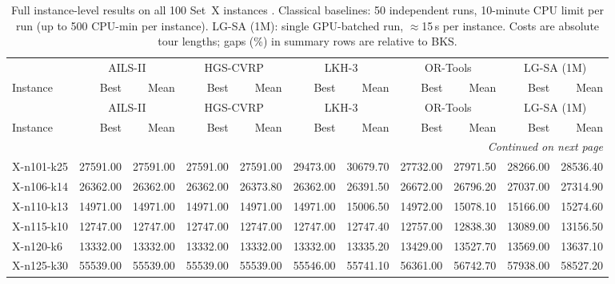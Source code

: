 \documentclass[letterpaper]{article} %
\begin{document}
\clearpage
\onecolumn
\begin{landscape}
\centering
\scriptsize
\setlength{\tabcolsep}{3pt}
\begin{longtable}{@{}l rr rr rr rr rr@{}}
\caption{Full instance-level results on all 100 Set~X instances \citep{uchoa_new_2017}. Classical baselines: 50 independent runs, 10-minute CPU limit per run (up to 500 CPU-min per instance). LG-SA (1M): single GPU-batched run, $\approx$15\,s per instance. Costs are absolute tour lengths; gaps (\%) in summary rows are relative to BKS.}
\label{tab:setx_full} \\
\toprule
& \multicolumn{2}{c}{AILS-II} & \multicolumn{2}{c}{HGS-CVRP} & \multicolumn{2}{c}{LKH-3} & \multicolumn{2}{c}{OR-Tools} & \multicolumn{2}{c}{LG-SA (1M)} \\
\cmidrule(lr){2-3}\cmidrule(lr){4-5}\cmidrule(lr){6-7}\cmidrule(lr){8-9}\cmidrule(lr){10-11}
Instance & Best & Mean & Best & Mean & Best & Mean & Best & Mean & Best & Mean \\
\midrule
\endfirsthead
\toprule
& \multicolumn{2}{c}{AILS-II} & \multicolumn{2}{c}{HGS-CVRP} & \multicolumn{2}{c}{LKH-3} & \multicolumn{2}{c}{OR-Tools} & \multicolumn{2}{c}{LG-SA (1M)} \\
\cmidrule(lr){2-3}\cmidrule(lr){4-5}\cmidrule(lr){6-7}\cmidrule(lr){8-9}\cmidrule(lr){10-11}
Instance & Best & Mean & Best & Mean & Best & Mean & Best & Mean & Best & Mean \\
\midrule
\endhead
\midrule
\multicolumn{11}{r}{\textit{Continued on next page}} \\
\midrule
\endfoot
\bottomrule
\endlastfoot
X-n101-k25 & 27591.00 & 27591.00 & 27591.00 & 27591.00 & 29473.00 & 30679.70 & 27732.00 & 27971.50 & 28266.00 & 28536.40 \\
X-n106-k14 & 26362.00 & 26362.00 & 26362.00 & 26373.80 & 26362.00 & 26391.50 & 26672.00 & 26796.20 & 27037.00 & 27314.90 \\
X-n110-k13 & 14971.00 & 14971.00 & 14971.00 & 14971.00 & 14971.00 & 15006.50 & 14972.00 & 15078.10 & 15166.00 & 15274.60 \\
X-n115-k10 & 12747.00 & 12747.00 & 12747.00 & 12747.00 & 12747.00 & 12747.40 & 12757.00 & 12838.30 & 13089.00 & 13156.50 \\
X-n120-k6 & 13332.00 & 13332.00 & 13332.00 & 13332.00 & 13332.00 & 13335.20 & 13429.00 & 13527.70 & 13569.00 & 13637.10 \\
X-n125-k30 & 55539.00 & 55539.00 & 55539.00 & 55539.00 & 55546.00 & 55741.10 & 56361.00 & 56742.70 & 57938.00 & 58527.20 \\

\end{longtable}
\end{landscape}
\end{document}
